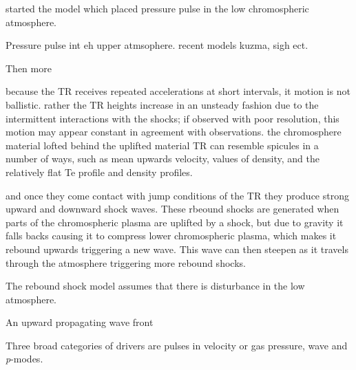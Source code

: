 \cite{Suematsu1982SoPh7599S} started the model which placed pressure pulse in the low chromospheric atmosphere. 

Pressure pulse int eh upper atmsophere. recent models kuzma, sigh ect. 

Then more


because the TR receives repeated accelerations at short intervals, it motion is not ballistic. rather the TR heights increase in an unsteady fashion due to the intermittent interactions with the shocks; if observed with poor resolution, this motion may appear constant in agreement with observations. the chromosphere material lofted behind the uplifted material TR can resemble spicules in a number of ways, such as mean upwards velocity, values of density, and the relatively flat Te profile and density profiles.  


and once they come contact with jump conditions of the TR they produce strong upward and downward shock waves. These rbeound shocks are generated when parts of the chromospheric plasma are uplifted by a shock, but due to gravity it falls backs causing it to compress lower chromospheric plasma, which makes it rebound upwards triggering a new wave. This wave can then steepen as it travels through the atmosphere triggering more rebound shocks.

The rebound shock model assumes that there is disturbance in the low atmosphere. 

An upward propagating wave front 

      


Three broad categories of drivers are pulses in velocity or gas pressure, \Alfven wave and \textit{p}-modes.
